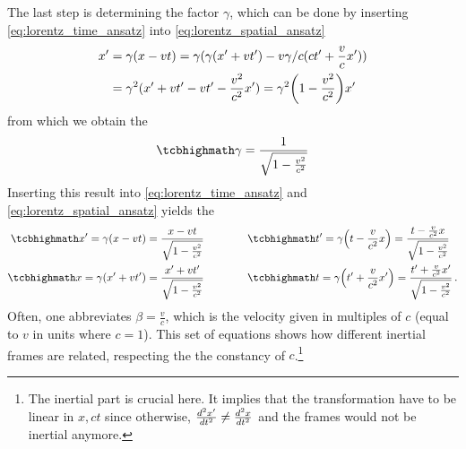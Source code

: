 The last step is determining the factor $\gamma$, which can be done by inserting \eqref{eq:lorentz_time_ansatz} into \eqref{eq:lorentz_spatial_ansatz}
\begin{align*}
	x' &= \gamma (x - vt) = \gamma (\gamma (x' + vt') - v \gamma / c (ct' + \frac{v}{c} x'))
	\\
	&= \gamma^2 (x' + vt' - vt' - \frac{v^2}{c^2} x') = \gamma^2 \qty(1 - \frac{v^2}{c^2}) x'
\end{align*}
from which we obtain the 
\begin{equation}\label{eq:gamma_factor}
	\eqbox{
	\gamma = \frac{1}{\sqrt{1 - \frac{v^2}{c^2}}}
	}
\end{equation}
Inserting this result into \eqref{eq:lorentz_time_ansatz} and \eqref{eq:lorentz_spatial_ansatz} yields the 
\begin{subequations}\label{eq:lorentz_trafo}
%
%
\begin{align}
	\eqbox{
	x' = \gamma \qty(x - vt) = \frac{x - vt}{\sqrt{1 - \frac{v^2}{c^2}}}
	}
	\qquad & \qquad
	\eqbox{
	t' = \gamma \qty(t - \frac{v}{c^2} x) = \frac{t - \frac{v}{c^2} x}{\sqrt{1 - \frac{v^2}{c^2}}}
	}
	\\
	\eqbox{
	x = \gamma \qty(x' + vt') = \frac{x' + vt'}{\sqrt{1 - \frac{v^2}{c^2}}}
	}
	\qquad & \qquad
	\eqbox{
	t = \gamma \qty(t' + \frac{v}{c^2} x') = \frac{t' + \frac{v}{c^2} x'}{\sqrt{1 - \frac{v^2}{c^2}}}
	} \, .
\end{align}
\end{subequations}
Often, one abbreviates $\beta = \frac{v}{c}$, which is the velocity given in multiples of $c$ (equal to $v$ in units where $c = 1$). This set of equations shows how different inertial frames are related, respecting the the constancy of $c$.\footnote{The inertial part is crucial here. It implies that the transformation have to be linear in $x, ct$ since otherwise, $\dv[2]{x'}{t} \neq \dv[2]{x}{t}$ and the frames would not be inertial anymore.}\\



